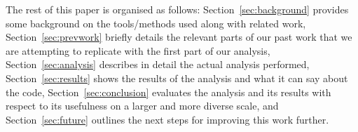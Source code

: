 The rest of this paper is organised as follows: Section~\ref{sec:background} provides some background on the tools/methods used along with related work, Section~\ref{sec:prevwork} briefly details the relevant parts of our past work that we are attempting to replicate with the first part of our analysis, Section~\ref{sec:analysis} describes in detail the actual analysis performed, Section~\ref{sec:results} shows the results of the analysis and what it can say about the code, Section~\ref{sec:conclusion} evaluates the analysis and its results with respect to its usefulness on a larger and more diverse scale, and Section~\ref{sec:future} outlines the next steps for improving this work further.
